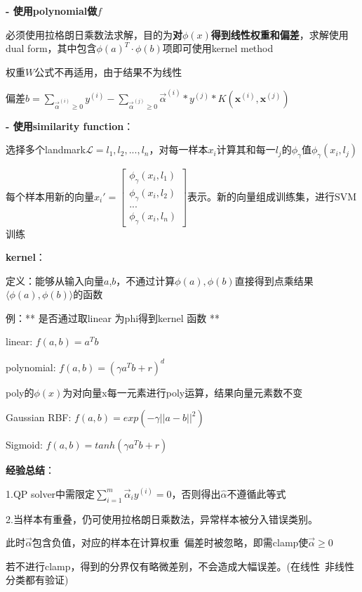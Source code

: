 \documentclass[UTF8]{ctexart}
\begin{document}
  \textbf{- 使用polynomial做$f$}

  \quad 必须使用拉格朗日乘数法求解，目的为\textbf{对$\phi(x)$得到线性权重和偏差}，求解使用dual form，其中包含$\phi(a)^T \cdot \phi(b)$项即可使用kernel method

  \quad 权重$W$公式不再适用，由于结果不为线性

  \quad 偏差$b = \sum_{\vec{\alpha}^{(i)} \geq 0} y^{(i)} - \sum_{\vec{\alpha}^{(j)} \geq 0} \vec{\alpha}^{(i)} * y^{(j)} * K(\mathbf{x}^{(i)}, \mathbf{x}^{(j)})$

  \textbf{- 使用similarity function}：
  
  \quad 选择多个landmark$\mathcal{L} = l_1, l_2, ..., l_n$，对每一样本$x_i$计算其和每一$l_j$的$\phi_{\gamma}$值$\phi_{\gamma}(x_i, l_j)$

  \quad 每个样本用新的向量$x_i' = \begin{bmatrix}
    \phi_{\gamma}(x_i, l_1) \\
    \phi_{\gamma}(x_i, l_2) \\
    ... \\
    \phi_{\gamma}(x_i, l_n)
  \end{bmatrix}$表示。新的向量组成训练集，进行SVM训练

  \textbf{kernel}：

  \quad 定义：能够从输入向量$a$,$b$，不通过计算$\phi(a), \phi(b)$直接得到点乘结果$\langle \phi (a), \phi (b)\rangle $的函数

  \quad 例：** 是否通过取linear 为phi得到kernel 函数 **

  \quad \quad linear: $f(a, b) = a^Tb$

  \quad \quad polynomial: $f(a, b) = (\gamma a^Tb+r)^d$

  \quad \quad \quad poly的$\phi(x)$为对向量x每一元素进行poly运算，结果向量元素数不变

  \quad \quad Gaussian RBF: $f(a, b) = exp(-\gamma ||a-b||^2)$

  \quad \quad Sigmoid: $f(a, b) = tanh(\gamma a^Tb + r)$

  \quad \textbf{经验总结}：

  \quad \quad 1.QP solver中需限定$\sum_{i=1}^{m}\vec{\alpha}_iy^{(i)}=0$，否则得出$\hat{\alpha}$不遵循此等式

  \quad \quad 2.当样本有重叠，仍可使用拉格朗日乘数法，异常样本被分入错误类别。

  \quad \quad \quad 此时$\vec{\alpha}$包含负值，对应的样本在计算权重\ 偏差时被忽略，即需clamp使$\vec{\alpha} \geq 0$

  \quad \quad \quad 若不进行clamp，得到的分界仅有略微差别，不会造成大幅误差。(在线性\ 非线性分类都有验证)
\end{document}

